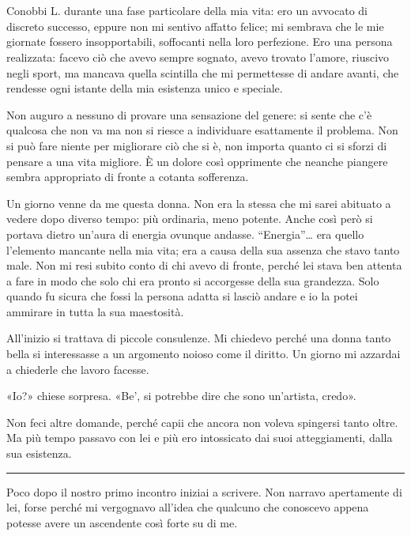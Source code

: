 \chapter{}
\label{ch:1}

Conobbi L. durante una fase particolare della mia vita: ero un avvocato di discreto successo, eppure
non mi sentivo affatto felice; mi sembrava che le mie giornate fossero insopportabili, soffocanti
nella loro perfezione. Ero una persona realizzata: facevo ciò che avevo sempre sognato, avevo
trovato l'amore, riuscivo negli sport, ma mancava quella scintilla che mi permettesse di andare
avanti, che rendesse ogni istante della mia esistenza unico e speciale.

Non auguro a nessuno di provare una sensazione del genere: si sente che c'è qualcosa che non va ma
non si riesce a individuare esattamente il problema. Non si può fare niente per migliorare ciò che
si è, non importa quanto ci si sforzi di pensare a una vita migliore. È un dolore così opprimente
che neanche piangere sembra appropriato di fronte a cotanta sofferenza.

Un giorno venne da me questa donna. Non era la stessa che mi sarei abituato a vedere dopo diverso
tempo: più ordinaria, meno potente. Anche così però si portava dietro un'aura di energia ovunque
andasse. ``Energia''\dots{} era quello l'elemento mancante nella mia vita; era a causa della sua
assenza che stavo tanto male. Non mi resi subito conto di chi avevo di fronte, perché lei stava ben
attenta a fare in modo che solo chi era pronto si accorgesse della sua grandezza. Solo quando fu
sicura che fossi la persona adatta si lasciò andare e io la potei ammirare in tutta la sua
maestosità.

All'inizio si trattava di piccole consulenze. Mi chiedevo perché una donna tanto bella si
interessasse a un argomento noioso come il diritto. Un giorno mi azzardai a chiederle che lavoro
facesse.

«Io?» chiese sorpresa. «Be', si potrebbe dire che sono un'artista, credo».

Non feci altre domande, perché capii che ancora non voleva spingersi tanto oltre. Ma più tempo
passavo con lei e più ero intossicato dai suoi atteggiamenti, dalla sua esistenza.

\plainbreak{1}

Poco dopo il nostro primo incontro iniziai a scrivere. Non narravo apertamente di lei, forse perché
mi vergognavo all'idea che qualcuno che conoscevo appena potesse avere un ascendente così forte su
di me.

